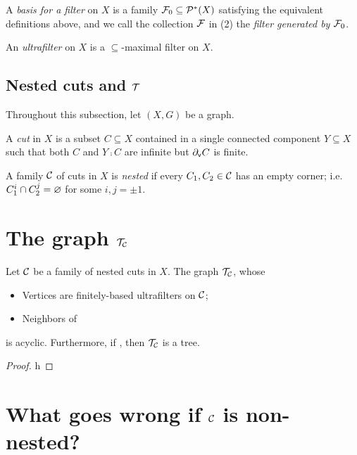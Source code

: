 \documentclass{amsart}
\begin{document}
    \begin{definition}
        A \textit{basis for a filter} on $X$ is a family $\mc{F}_0\subseteq\pow^\ast(X)$ satisfying the equivalent definitions above, and we call the collection $\mc{F}$ in (2) the \textit{filter generated by $\mc{F}_0$}.
    \end{definition}

    \begin{definition}
        An \textit{ultrafilter} on $X$ is a $\subseteq$-maximal filter on $X$.
    \end{definition}

    \subsection{Nested cuts and $\mc{T}$}

    Throughout this subsection, let $(X,G)$ be a graph.

    \begin{definition}
        A \textit{cut} in $X$ is a subset $C\subseteq X$ contained in a single connected component $Y\subseteq X$ such that both $C$ and $Y\comp C$ are infinite but $\del_\mathsf{v}C$ is finite.
    \end{definition}
    \begin{definition}
        A family $\mc{C}$ of cuts in $X$ is \textit{nested} if every $C_1,C_2\in\mc{C}$ has an empty corner; i.e. $C_1^i\cap C_2^j=\em$ for some $i,j=\pm1$.
    \end{definition}

    \section{The graph $\mc{T}_\mc{C}$}

    \begin{theorem}
        Let $\mc{C}$ be a family of nested cuts in $X$. The graph $\mc{T}_\mc{C}$, whose
        \begin{itemize}
            \item Vertices are finitely-based ultrafilters on $\mc{C}$;
            \item Neighbors of
        \end{itemize}
        is acyclic. Furthermore, if {\color{red}{something}}, then $\mc{T}_\mc{C}$ is a tree.
    \end{theorem}
    \begin{proof}
        h
    \end{proof}

    \section{What goes wrong if $\mc{C}$ is non-nested?}
\end{document}
